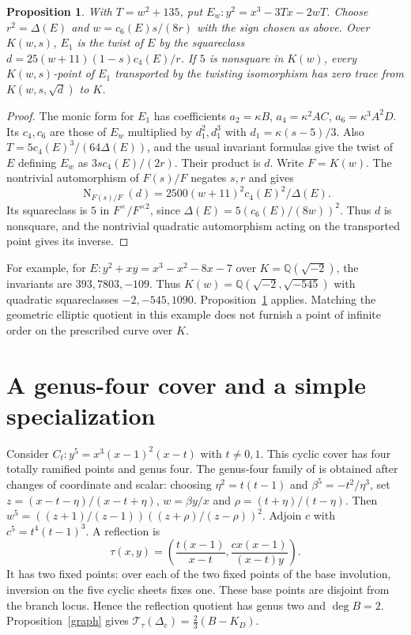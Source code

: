 \documentclass[11pt]{article}
\newtheorem{proposition}[theorem]{Proposition}
\newcommand{\Q}{\mathbb Q}
\begin{document}
\begin{proposition}\label{twist}
With $T=w^2+135$, put $E_w:y^2=x^3-3Tx-2wT$. Choose $r^2=\Delta(E)$
and $w=c_6(E)s/(8r)$ with the sign chosen as above. Over $K(w,s)$,
$E_1$ is the twist of $E$ by the squareclass
$d=25(w+11)(1-s)c_4(E)/r$. If $5$ is nonsquare in $K(w)$, every
$K(w,s)$-point of $E_1$ transported by the twisting isomorphism has
zero trace from $K(w,s,\sqrt d)$ to $K$.
\end{proposition}
\begin{proof}
The monic form for $E_1$ has coefficients
$a_2=\kappa B$, $a_4=\kappa^2AC$, $a_6=\kappa^3 A^2D$.
Its $c_4,c_6$ are those of $E_w$ multiplied by $d_1^2,d_1^3$ with
$d_1=\kappa(s-5)/3$. Also $T=5c_4(E)^3/(64\Delta(E))$, and the
usual invariant formulas give the twist of $E$ defining $E_w$ as
$3sc_4(E)/(2r)$. Their product is $d$. Write $F=K(w)$.
The nontrivial automorphism of $F(s)/F$ negates $s,r$ and gives
\[
 \operatorname{N}_{F(s)/F}(d)=2500(w+11)^2c_4(E)^2/\Delta(E).
\]
Its squareclass is $5$ in $F^\times/F^{\times2}$, since
$\Delta(E)=5(c_6(E)/(8w))^2$. Thus $d$ is nonsquare, and the nontrivial
quadratic automorphism acting on the transported point gives its inverse.
\end{proof}
For example, for $E:y^2+xy=x^3-x^2-8x-7$ over $K=\Q(\sqrt{-2})$,
the invariants are $393,7803,-109$. Thus $K(w)=\Q(\sqrt{-2},\sqrt{-545})$
with quadratic squareclasses $-2,-545,1090$. Proposition~\ref{twist}
applies. Matching the geometric elliptic quotient in this example
does not furnish a point of infinite order on the prescribed curve
over $K$.

\section{A genus-four cover and a simple specialization}
Consider $C_t:y^5=x^3(x-1)^2(x-t)$ with $t\ne0,1$. This cyclic cover
has four totally ramified points and genus four. The genus-four family
of \cite[Example 3.8]{LS} is obtained after changes of coordinate and
scalar: choosing $\eta^2=t(t-1)$ and $\beta^5=-t^2/\eta^3$, set
$z=(x-t-\eta)/(x-t+\eta)$, $w=\beta y/x$ and
$\rho=(t+\eta)/(t-\eta)$. Then
$w^5=((z+1)/(z-1))((z+\rho)/(z-\rho))^2$.
Adjoin $c$ with $c^5=t^4(t-1)^3$. A reflection is
\[
 \tau(x,y)=\left(\frac{t(x-1)}{x-t},
                    \frac{cx(x-1)}{(x-t)y}\right).
\]
It has two fixed points: over each of the two fixed points of the
base involution, inversion on the five cyclic sheets fixes one.
These base points are disjoint from the branch locus. Hence the
reflection quotient has genus two and $\deg B=2$.
Proposition~\ref{graph} gives
$\mathcal T_\tau(\Delta_e)=\frac23(B-K_D)$.
\end{document}
